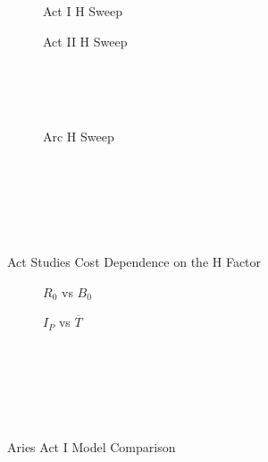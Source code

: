 \begin{figure*}[h!]
    \centering
    \hfill 
    \begin{subfigure}[t]{0.4\textwidth}
        \centering
    \begin{adjustbox}{width=\textwidth}
      \Large
      
    \end{adjustbox}
        \caption{Act I H Sweep}
    \end{subfigure}
    \hfill
    \begin{subfigure}[t]{0.4\textwidth}
        \centering
    \begin{adjustbox}{width=\textwidth}
      \Large
      
    \end{adjustbox}
        \caption{Act II H Sweep}
    \end{subfigure}
    \hfill \hfill ~\\ ~\\ ~\\
    \begin{subfigure}[t]{0.4\textwidth}
        \centering
		\begin{adjustbox}{width=\textwidth}
			\Large
			
		\end{adjustbox}
        \caption{Arc H Sweep}
    \end{subfigure} ~\\ ~\\ ~\\
    \caption{Act Studies Cost Dependence on the H Factor} ~\\    
	\label{fig:act_h_cost}
\end{figure*}

\clearpage

\newpage

\begin{figure*}[h!]
    \centering
    \hfill 
    \begin{subfigure}[t]{0.45\textwidth}
        \centering
    \begin{adjustbox}{width=\textwidth}
      \Large
      
    \end{adjustbox}
        \caption{$R_0$ vs $B_0$}
    \end{subfigure}
    \hfill
    \begin{subfigure}[t]{0.45\textwidth}
        \centering
    \begin{adjustbox}{width=\textwidth}
      \Large
      
    \end{adjustbox}
        \caption{$I_P$ vs $\overline T$}
    \end{subfigure}
    \hfill \hfill ~\\ ~\\ ~\\
    \caption{Aries Act I Model Comparison} ~\\
    \label{fig:act_1_comparison}
\end{figure*}

